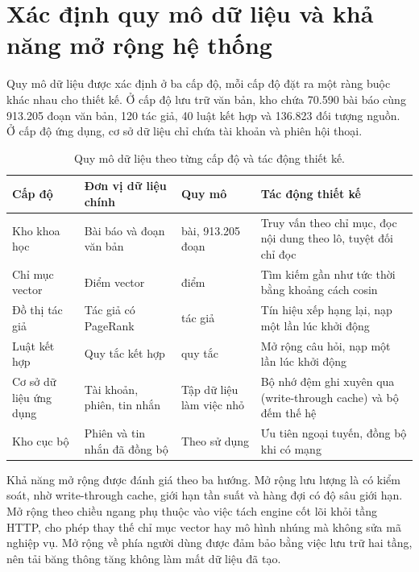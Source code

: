 \section{Xác định quy mô dữ liệu và khả năng mở rộng hệ thống}
\label{sec:quy-mo-du-lieu}

Quy mô dữ liệu được xác định ở ba cấp độ, mỗi cấp độ đặt ra một ràng buộc khác nhau cho thiết kế. Ở cấp độ lưu trữ văn bản, kho chứa 70.590 bài báo cùng 913.205 đoạn văn bản, 120 tác giả, 40 luật kết hợp và 136.823 đối tượng nguồn. Ở cấp độ ứng dụng, cơ sở dữ liệu chỉ chứa tài khoản và phiên hội thoại.

\begin{table}[htbp]
    \centering
    \caption{Quy mô dữ liệu theo từng cấp độ và tác động thiết kế.}
    \label{tab:quy-mo-du-lieu}
    \small
    \begin{tabularx}{\textwidth}{@{}>{\raggedright\arraybackslash}p{2.8cm}>{\raggedright\arraybackslash}p{3.0cm}>{\raggedright\arraybackslash}p{2.8cm}>{\raggedright\arraybackslash}X@{}}
        \toprule
        \textbf{Cấp độ} & \textbf{Đơn vị dữ liệu chính} & \textbf{Quy mô} & \textbf{Tác động thiết kế} \\
        \midrule
        Kho khoa học & Bài báo và đoạn văn bản & 70.590 bài, 913.205 đoạn & Truy vấn theo chỉ mục, đọc nội dung theo lô, tuyệt đối chỉ đọc \\
        Chỉ mục vector & Điểm vector & 913.205 điểm & Tìm kiếm gần như tức thời bằng khoảng cách cosin \\
        Đồ thị tác giả & Tác giả có PageRank & 120 tác giả & Tín hiệu xếp hạng lại, nạp một lần lúc khởi động \\
        Luật kết hợp & Quy tắc kết hợp & 40 quy tắc & Mở rộng câu hỏi, nạp một lần lúc khởi động \\
        Cơ sở dữ liệu ứng dụng & Tài khoản, phiên, tin nhắn & Tập dữ liệu làm việc nhỏ & Bộ nhớ đệm ghi xuyên qua (write-through cache) và bộ đếm thế hệ \\
        Kho cục bộ & Phiên và tin nhắn đã đồng bộ & Theo sử dụng & Ưu tiên ngoại tuyến, đồng bộ khi có mạng \\
        \bottomrule
    \end{tabularx}
\end{table}

Khả năng mở rộng được đánh giá theo ba hướng. Mở rộng lưu lượng là có kiểm soát, nhờ write-through cache, giới hạn tần suất và hàng đợi có độ sâu giới hạn. Mở rộng theo chiều ngang phụ thuộc vào việc tách engine cốt lõi khỏi tầng HTTP, cho phép thay thế chỉ mục vector hay mô hình nhúng mà không sửa mã nghiệp vụ. Mở rộng về phía người dùng được đảm bảo bằng việc lưu trữ hai tầng, nên tải băng thông tăng không làm mất dữ liệu đã tạo.

